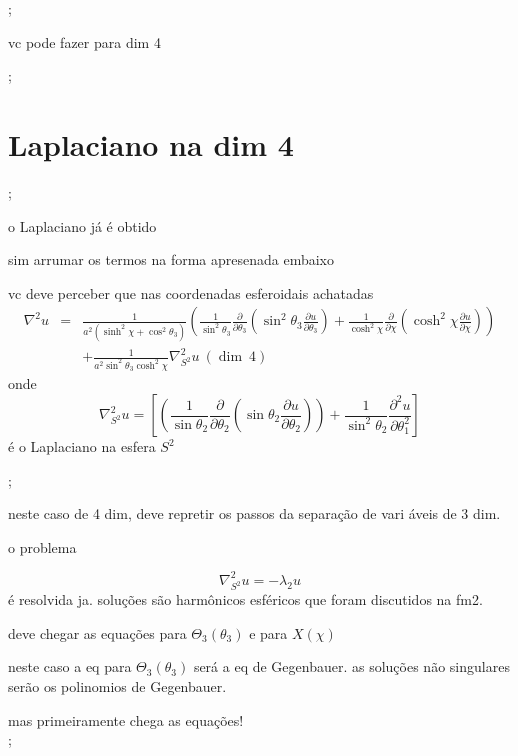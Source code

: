 \documentclass[a4paper,12pt]{article}
\begin{document}
;

vc pode fazer para dim 4

; 

\section{Laplaciano na dim 4}

;

o Laplaciano j\'{a} \'{e} obtido

sim arrumar os termos na forma apresenada embaixo

vc deve perceber que nas coordenadas esferoidais achatadas%
\begin{eqnarray*}
\nabla ^{2}u &=&\frac{1}{a^{2}\left( \sinh ^{2}\chi +\cos ^{2}\theta
_{3}\right) }\left( \frac{1}{\sin ^{2}\theta _{3}}\frac{\partial }{\partial
\theta _{3}}\left( \sin ^{2}\theta _{3}\frac{\partial u}{\partial \theta _{3}%
}\right) +\frac{1}{\cosh ^{2}\chi }\frac{\partial }{\partial \chi }\left(
\cosh ^{2}\chi \frac{\partial u}{\partial \chi }\right) \right)  \\
&&+\frac{1}{a^{2}\sin ^{2}\theta _{3}\cosh ^{2}\chi }\nabla _{S^{2}}^{2}u\
\left( \dim \ 4\right) 
\end{eqnarray*}%
onde 
\begin{equation*}
\nabla _{S^{2}}^{2}u=\left[ \left( \frac{1}{\sin \theta _{2}}\frac{\partial 
}{\partial \theta _{2}}\left( \sin \theta _{2}\frac{\partial u}{\partial
\theta _{2}}\right) \right) +\frac{1}{\sin ^{2}\theta _{2}}\frac{\partial
^{2}u}{\partial \theta _{1}^{2}}\right] 
\end{equation*}%
\'{e} o Laplaciano na esfera $S^{2}$

;

neste caso de 4 dim, deve repretir os passos da separa\c{c}\~{a}o de vari%
\'{a}veis de 3 dim.

o problema 

\begin{equation*}
\nabla _{S^{2}}^{2}u=-\lambda _{2}u
\end{equation*}%
\'{e} resolvida ja. solu\c{c}\~{o}es s\~{a}o harm\^{o}nicos esf\'{e}ricos
que foram discutidos na fm2. 

deve chegar as equa\c{c}\~{o}es para $\Theta _{3}\left( \theta _{3}\right) $
e para $X\left( \chi \right) $

neste caso a eq para $\Theta _{3}\left( \theta _{3}\right) $ ser\'{a} a eq
de Gegenbauer. as solu\c{c}\~{o}es n\~{a}o singulares ser\~{a}o os
polinomios de Gegenbauer.

mas primeiramente chega as equa\c{c}\~{o}es!%
\begin{equation*}
\end{equation*}%
;
\end{document}

